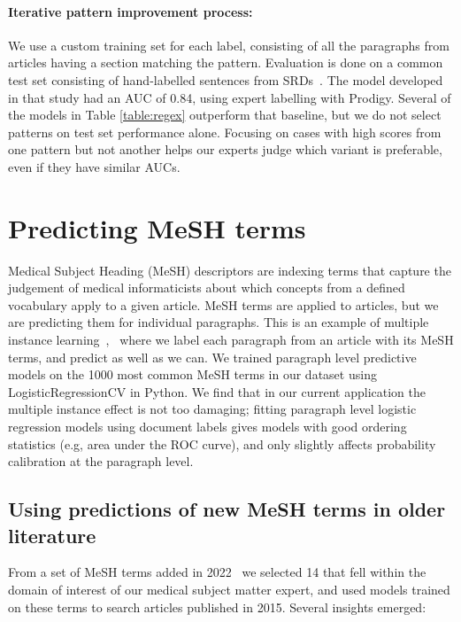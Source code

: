 \documentclass[letterpaper]{article} %
\begin{document}
\paragraph{\textbf{Iterative pattern improvement process:}} We use a custom training set for each label, consisting of all the paragraphs from articles having a section matching the pattern. Evaluation is done on a common test set consisting of
hand-labelled sentences from SRDs~\cite{lau_2024}. The model developed in that study had an AUC of 0.84, using expert labelling with Prodigy. Several of the models in Table \ref{table:regex} outperform that baseline, but we do not select patterns on test set performance alone. Focusing on cases with high scores from one pattern but not another helps our experts judge which variant is preferable, even if they have similar AUCs.

\section{Predicting MeSH terms}

Medical Subject Heading (MeSH) descriptors are indexing terms that capture the judgement of medical informaticists about which concepts from a defined vocabulary apply to a given article. MeSH terms are applied to articles, but we are predicting them for individual paragraphs. This is an example of multiple instance learning~\cite{dietterich1997solving},~\cite{babenko_2008} where we label each paragraph from an article with its MeSH terms, and predict as well as we can. We trained paragraph level predictive models on the 1000 most common MeSH terms in our dataset using LogisticRegressionCV in Python. We find that in our current application the multiple instance effect is not too damaging; fitting paragraph level logistic regression models using document labels gives models with good ordering statistics (e.g, area under the ROC curve), and only slightly affects probability calibration at the paragraph level.

\subsection{Using predictions of new MeSH terms in older literature}

From a set of MeSH terms added in 2022~\cite{mesh2022} we selected 14 that fell within the domain of interest of our medical subject matter expert, and used models trained on these terms to search articles published in 2015. Several insights emerged:
\end{document}
